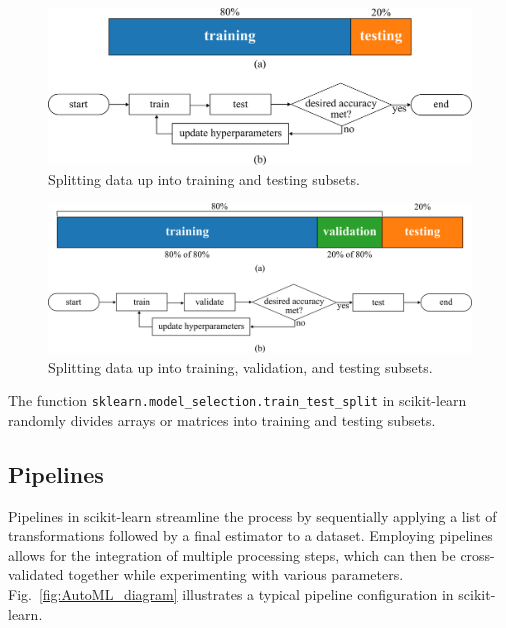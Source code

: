 \documentclass[12pt,letter]{article}
\begin{document}
		\begin{figure}[H]
			\centering
			\includegraphics[]{../figures/training_test_datasets}
			\caption{Splitting data up into training and testing subsets.}
			\label{fig:training_test_datasets}
		\end{figure}


		\begin{figure}[H]
			\centering
			\includegraphics[]{../figures/training_validation_test_datasets}
			\caption{Splitting data up into training, validation, and testing subsets.}
			\label{fig:training_validation_test_datasets}
		\end{figure}


The function \texttt{sklearn.model\_selection.train\_test\_split} in scikit-learn randomly divides arrays or matrices into training and testing subsets.

\pagebreak

\subsection{Pipelines}


Pipelines in scikit-learn streamline the process by sequentially applying a list of transformations followed by a final estimator to a dataset. Employing pipelines allows for the integration of multiple processing steps, which can then be cross-validated together while experimenting with various parameters. Fig.~\ref{fig:AutoML_diagram} illustrates a typical pipeline configuration in scikit-learn.
\end{document}
